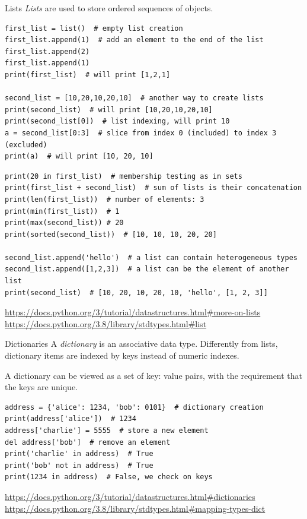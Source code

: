 \documentclass[aspectratio=169,handout]{beamer}
\begin{document}
\begin{frame}{Lists}
    \emph{Lists} are used to store \alert{ordered sequences} of objects.

        \begin{verbatim}
first_list = list()  # empty list creation
first_list.append(1)  # add an element to the end of the list
first_list.append(2)
first_list.append(1)
print(first_list)  # will print [1,2,1]

second_list = [10,20,10,20,10]  # another way to create lists
print(second_list)  # will print [10,20,10,20,10]
print(second_list[0])  # list indexing, will print 10
a = second_list[0:3]  # slice from index 0 (included) to index 3 (excluded)
print(a)  # will print [10, 20, 10]
        \end{verbatim}

        \framebreak
        \begin{verbatim}
print(20 in first_list)  # membership testing as in sets
print(first_list + second_list)  # sum of lists is their concatenation
print(len(first_list))  # number of elements: 3
print(min(first_list))  # 1
print(max(second_list)) # 20
print(sorted(second_list))  # [10, 10, 10, 20, 20]

second_list.append('hello')  # a list can contain heterogeneous types
second_list.append([1,2,3])  # a list can be the element of another list
print(second_list)  # [10, 20, 10, 20, 10, 'hello', [1, 2, 3]]
        \end{verbatim}

        \footnotesize{
            \url{https://docs.python.org/3/tutorial/datastructures.html#more-on-lists}
            \url{https://docs.python.org/3.8/library/stdtypes.html#list}
        }
\end{frame}

\begin{frame}[fragile]{Dictionaries}
    A \emph{dictionary} is an associative data type.
    Differently from lists, dictionary items are indexed by \alert{keys} instead of numeric indexes.

    A dictionary can be viewed as a set of \alert{key: value} pairs, with the requirement that the keys are unique.

        \begin{verbatim}
address = {'alice': 1234, 'bob': 0101}  # dictionary creation
print(address['alice'])  # 1234
address['charlie'] = 5555  # store a new element
del address['bob']  # remove an element
print('charlie' in address)  # True
print('bob' not in address)  # True
print(1234 in address)  # False, we check on keys
        \end{verbatim}

        \footnotesize{
    \url{https://docs.python.org/3/tutorial/datastructures.html#dictionaries}
    \url{https://docs.python.org/3.8/library/stdtypes.html#mapping-types-dict}
}
\end{frame}
\end{document}
